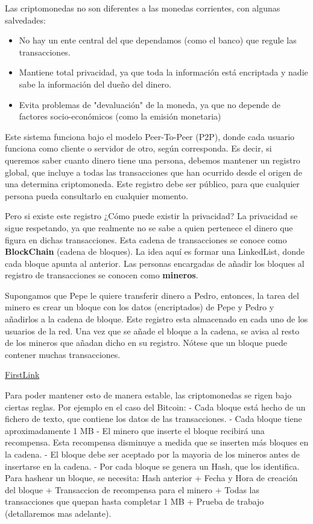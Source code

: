 \documentclass[a4paper,10pt]{article}
\begin{document}
Las criptomonedas no son diferentes a las monedas corrientes, con algunas salvedades:

\begin{itemize}
 \item No hay un ente central del que dependamos (como el banco) que regule las transacciones.

 \item Mantiene total privacidad, ya que toda la información está encriptada y nadie sabe la información del dueño del dinero.

 \item Evita problemas de "devaluación" de la moneda, ya que no depende de factores socio-económicos (como la emisión monetaria)
\end{itemize}

Este sistema funciona bajo el modelo Peer-To-Peer (P2P), donde cada usuario funciona como cliente o servidor de otro, según corresponda. Es decir, si queremos saber cuanto dinero tiene una persona, debemos mantener un registro global, que incluye a todas las transacciones que han ocurrido desde el origen de una determina criptomoneda. Este registro debe ser público, para que cualquier persona pueda consultarlo en cualquier momento.

Pero si existe este registro ¿Cómo puede existir la privacidad?
La privacidad se sigue respetando, ya que realmente no se sabe a quien pertenece el dinero que figura en dichas transacciones. Esta cadena de transacciones se conoce como \textbf{BlockChain} (cadena de bloques). La idea aquí es formar una LinkedList, donde cada bloque apunta al anterior.
Las personas encargadas de añadir los bloques al registro de transacciones se conocen como \textbf{mineros}.

Supongamos que Pepe le quiere transferir dinero a Pedro, entonces, la tarea del minero es crear un bloque con los datos (encriptados) de Pepe y Pedro y añadirlos a la cadena de bloque. Este registro esta almacenado en cada uno de los usuarios de la red. Una vez que se añade el bloque a la cadena, se avisa al resto de los mineros que añadan dicho en su registro.
Nótese que un bloque puede contener muchas transacciones.

\href{https://user-images.githubusercontent.com/63267942/148128644-24016ab7-d877-47fb-ba4d-23a4dd8702f3.png}{FirstLink}

Para poder mantener esto de manera estable, las criptomonedas se rigen bajo ciertas reglas. Por ejemplo en el caso del Bitcoin:
 - Cada bloque está hecho de un fichero de texto, que contiene los datos de las transacciones.
 - Cada bloque tiene aproximadamente 1 MB
 - El minero que inserte el bloque recibirá una recompensa. Esta recompensa disminuye a medida que se inserten más bloques en la cadena.
 - El bloque debe ser aceptado por la mayoria de los mineros antes de insertarse en la cadena.
 - Por cada bloque se genera un Hash, que los identifica. Para hashear un bloque, se necesita: Hash anterior + Fecha y Hora de creación del bloque + Transaccion de recompensa para el minero + Todas las transacciones que quepan hasta completar 1 MB + Prueba de trabajo (detallaremos mas adelante).
\end{document}
